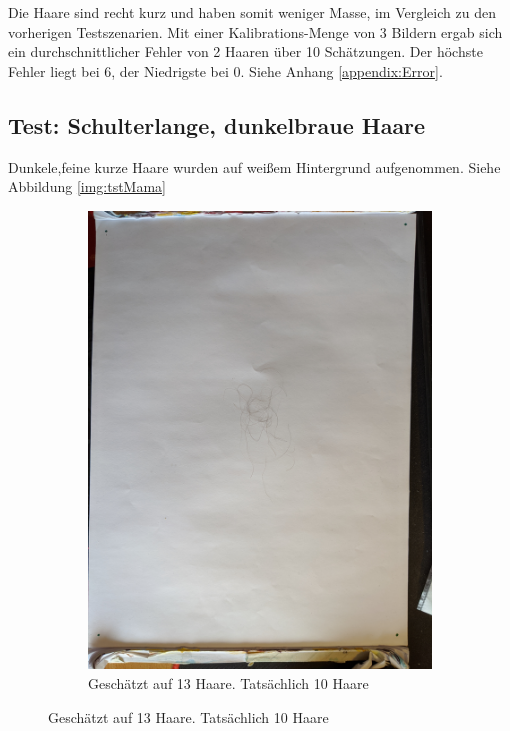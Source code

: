 \documentclass[german,a4paper, 12pt]{llncs}
\begin{document}
Die Haare sind recht kurz und haben somit weniger Masse, im Vergleich zu den vorherigen Testszenarien. Mit einer Kalibrations-Menge von 3 Bildern ergab sich ein durchschnittlicher Fehler von 2 Haaren über 10 Schätzungen. Der höchste Fehler liegt bei 6, der Niedrigste bei 0.
Siehe Anhang \ref{appendix:Error}.

\subsection{Test: Schulterlange, dunkelbraue Haare}

Dunkele,feine kurze Haare wurden auf weißem Hintergrund aufgenommen. Siehe Abbildung \ref{img:tstMama}

\begin{figure}
	\centering
	\begin{subfigure}[b]{0.475\textwidth}
		\centering
		\includegraphics[width=\textwidth]{figMama/IMG_20200327_140450_10.jpg}
		\caption[]{Geschätzt auf 13 Haare. Tatsächlich 10 Haare}

\end{subfigure}
\end{figure}
\end{document}
